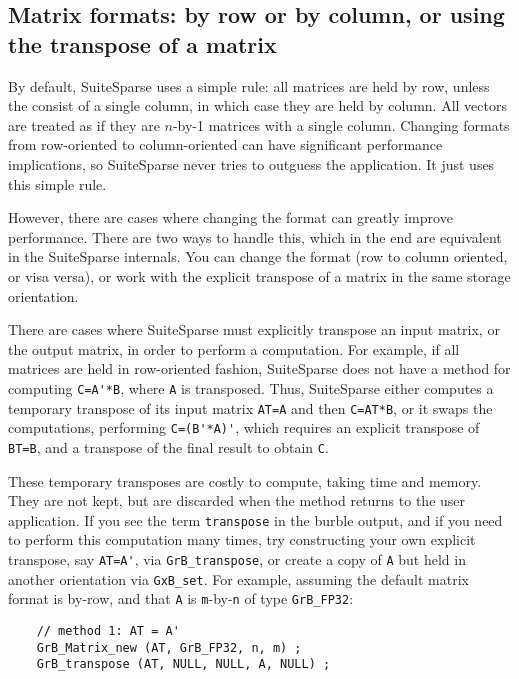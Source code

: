 \documentclass[12pt]{article}
\begin{document}
{\subsection{Matrix formats: by row or by column, or using the transpose of
a matrix}

By default, SuiteSparse uses a simple rule:
all matrices are held by row, unless the consist of a single
column, in which case they are held by column.  All vectors are treated as if
they are $n$-by-1 matrices with a single column.  Changing formats from
row-oriented to column-oriented can have significant performance implications,
so SuiteSparse never tries to outguess the application.  It just uses this
simple rule.

However, there are cases where changing the format can greatly improve
performance.  There are two ways to handle this, which in the end are
equivalent in the SuiteSparse internals.  You can change the format (row to
column oriented, or visa versa), or work with the explicit transpose of a
matrix in the same storage orientation.

There are cases where SuiteSparse must explicitly transpose an input matrix, or
the output matrix, in order to perform a computation.  For example, if all
matrices are held in row-oriented fashion, SuiteSparse does not have a method
for computing \verb"C=A'*B", where \verb'A' is transposed.  Thus, SuiteSparse
either computes a temporary transpose of its input matrix \verb'AT=A' and then
\verb'C=AT*B', or it swaps the computations, performing \verb"C=(B'*A)'", which
requires an explicit transpose of \verb'BT=B', and a transpose of the final
result to obtain \verb'C'.

These temporary transposes are costly to compute, taking time and memory.  They
are not kept, but are discarded when the method returns to the user
application.  If you see the term \verb'transpose' in the burble output, and if
you need to perform this computation many times, try constructing your own
explicit transpose, say \verb"AT=A'", via \verb'GrB_transpose', or create a
copy of \verb'A' but held in another orientation via \verb'GxB_set'.  For
example, assuming the default matrix format is by-row, and that \verb'A' is
\verb'm'-by-\verb'n' of type \verb'GrB_FP32':

    {\scriptsize
    \begin{verbatim}
    // method 1: AT = A'
    GrB_Matrix_new (AT, GrB_FP32, n, m) ;
    GrB_transpose (AT, NULL, NULL, A, NULL) ;


\end{verbatim}}}
\end{document}
